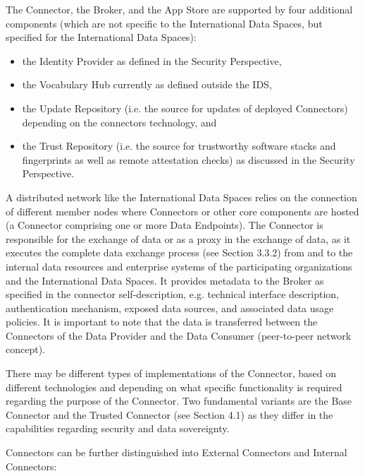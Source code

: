 
The Connector, the Broker, and the App Store are supported by four additional components (which are not specific to the International Data Spaces, but specified for the International Data Spaces):

\begin{itemize}
	\item the Identity Provider as defined in the Security Perspective,

	\item the Vocabulary Hub currently as defined outside the IDS,

	\item the Update Repository (i.e. the source for updates of deployed Connectors) depending on the connectors technology, and

	\item the Trust Repository (i.e. the source for trustworthy software stacks and fingerprints as well as remote attestation checks) as discussed in the Security Perspective.
\end{itemize}

A distributed network like the International Data Spaces relies on the connection of different member nodes where Connectors or other core components are hosted (a Connector comprising one or more Data Endpoints). The Connector is responsible for the exchange of data or as a proxy in the exchange of data, as it executes the complete data exchange process (see Section 3.3.2) from and to the internal data resources and enterprise systems of the participating organizations and the International Data Spaces. It provides metadata to the Broker as specified in the connector self-description, e.g. technical interface description, authentication mechanism, exposed data sources, and associated data usage policies. It is important to note that the data is transferred between the Connectors of the Data Provider and the Data Consumer (peer-to-peer network concept).

There may be different types of implementations of the Connector, based on different technologies and depending on what specific functionality is required regarding the purpose of the Connector. Two fundamental variants are the Base Connector and the Trusted Connector (see Section 4.1) as they differ in the capabilities regarding security and data sovereignty.

Connectors can be further distinguished into External Connectors and Internal Connectors:

